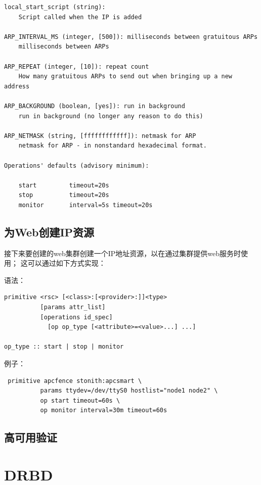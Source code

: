 \begin{verbatim}
local_start_script (string): 
    Script called when the IP is added

ARP_INTERVAL_MS (integer, [500]): milliseconds between gratuitous ARPs
    milliseconds between ARPs

ARP_REPEAT (integer, [10]): repeat count
    How many gratuitous ARPs to send out when bringing up a new address

ARP_BACKGROUND (boolean, [yes]): run in background
    run in background (no longer any reason to do this)

ARP_NETMASK (string, [ffffffffffff]): netmask for ARP
    netmask for ARP - in nonstandard hexadecimal format.

Operations' defaults (advisory minimum):

    start         timeout=20s
    stop          timeout=20s
    monitor       interval=5s timeout=20s
\end{verbatim}

\section{为Web创建IP资源}

接下来要创建的web集群创建一个IP地址资源，以在通过集群提供web服务时使用；
这可以通过如下方式实现：

语法：

\begin{verbatim}
primitive <rsc> [<class>:[<provider>:]]<type>
          [params attr_list]
          [operations id_spec]
            [op op_type [<attribute>=<value>...] ...]

op_type :: start | stop | monitor
\end{verbatim}

例子：

\begin{verbatim}
 primitive apcfence stonith:apcsmart \
          params ttydev=/dev/ttyS0 hostlist="node1 node2" \
          op start timeout=60s \
          op monitor interval=30m timeout=60s
\end{verbatim}


\section{高可用验证}

\chapter{DRBD}
\label{chap:drbd}

